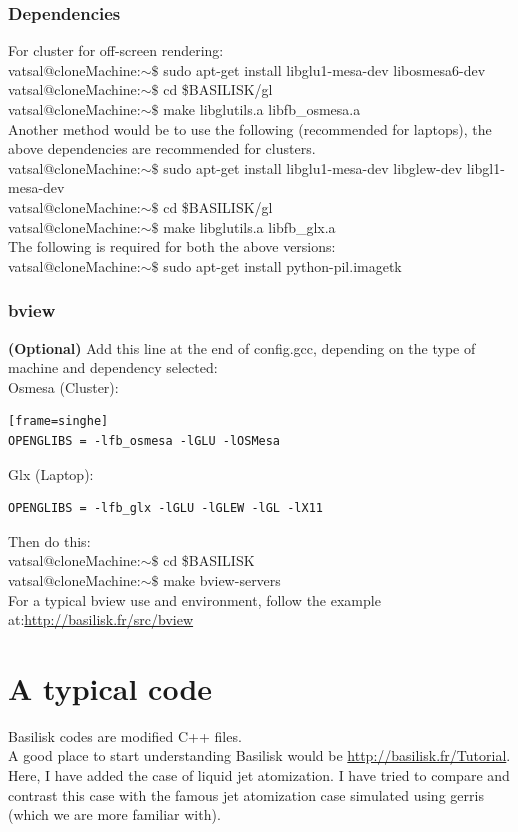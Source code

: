 \documentclass[]{article}
\newcommand\Colorhref[3][blue]{\href{#2}{\color{#1}#3}}
\begin{document}
\subsubsection{Dependencies}
For cluster for off-screen rendering:\\
{\color{red}vatsal@cloneMachine:$\sim\$$} sudo apt-get install libglu1-mesa-dev libosmesa6-dev\\
{\color{red}vatsal@cloneMachine:$\sim\$$} cd \$BASILISK/gl\\
{\color{red}vatsal@cloneMachine:$\sim\$$} make libglutils.a libfb\_osmesa.a\\
Another method would be to use the following (recommended for laptops), the above dependencies are recommended for clusters.\\
{\color{red}vatsal@cloneMachine:$\sim\$$} sudo apt-get install libglu1-mesa-dev libglew-dev libgl1-mesa-dev\\
{\color{red}vatsal@cloneMachine:$\sim\$$} cd \$BASILISK/gl\\
{\color{red}vatsal@cloneMachine:$\sim\$$} make libglutils.a libfb\_glx.a\\
The following is required for both the above versions:\\
{\color{red}vatsal@cloneMachine:$\sim\$$} sudo apt-get install python-pil.imagetk
\subsubsection{bview}
\textbf{(Optional)} Add this line at the end of config.gcc, depending on the type of machine and dependency selected:\\
Osmesa (Cluster):
\begin{verbatim}[frame=singhe]
OPENGLIBS = -lfb_osmesa -lGLU -lOSMesa
\end{verbatim}
Glx (Laptop):
\begin{verbatim}
OPENGLIBS = -lfb_glx -lGLU -lGLEW -lGL -lX11
\end{verbatim}
Then do this:\\
{\color{red}vatsal@cloneMachine:$\sim\$$} cd \$BASILISK\\
{\color{red}vatsal@cloneMachine:$\sim\$$} make bview-servers\\
For a typical bview use and environment, follow the example at:\Colorhref{http://basilisk.fr/src/bview}{http://basilisk.fr/src/bview}
\section{A typical code}
Basilisk codes are modified C++ files.\\
A good place to start understanding Basilisk would be \Colorhref{http://basilisk.fr/Tutorial}{http://basilisk.fr/Tutorial}. Here, I have added the case of liquid jet atomization. I have tried to compare and contrast this case with the famous jet atomization case simulated using gerris (which we are more familiar with).\\
\end{document}
